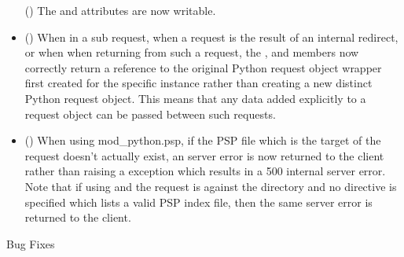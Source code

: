 \begin{itemize}
      ()
      The  and  attributes are
      now writable.
    \item
      ()
      When in a sub request, when a request is the result of an internal
      redirect, or when when returning from such a request, the
      ,  and  members now
      correctly return a reference to the original Python request object
      wrapper first created for the specific  instance
      rather than creating a new distinct Python request object. This means
      that any data added explicitly to a request object can be passed
      between such requests.
    \item
      ()
      When using mod_python.psp, if the PSP file which is the target of the
      request doesn't actually exist, an  server
      error is now returned to the client rather than raising a
       exception which results in a 500 internal server error.
      Note that if using  and the request is against the
      directory and no  directive is specified which
      lists a valid PSP index file, then the same 
      server error is returned to the client.
  \end{itemize}

  Bug Fixes

